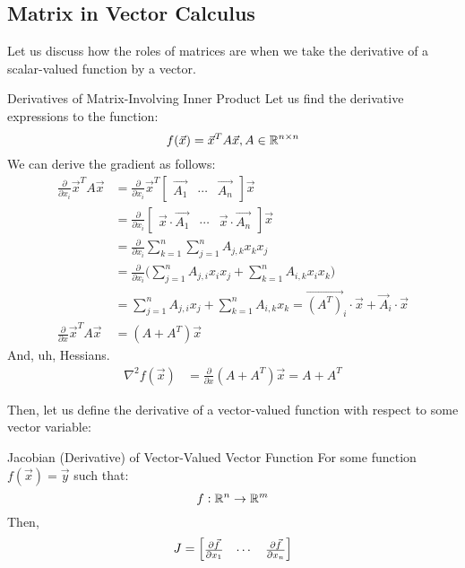 \subsection{Matrix in Vector Calculus}
Let us discuss how the roles of matrices are when we take the derivative of a scalar-valued function by a vector.
\begin{ln-explain}{Derivatives of Matrix-Involving Inner Product}{}
    Let us find the derivative expressions to the function:
    \[
        f(\vec{x}) = \vec{x}^T A \vec{x}, A \in \mathbb{R}^{n \times n}
    \]
    We can derive the gradient as follows:
    \begin{align*}
        \frac{\partial}{\partial x_i} \vec{x}^T A \vec{x}
        &= \frac{\partial}{\partial x_i} \vec{x}^T \begin{bmatrix} \vec{A_1} & \cdots & \vec{A_n} \end{bmatrix} \vec{x} \\
        &= \frac{\partial}{\partial x_i} \begin{bmatrix} \vec{x} \cdot \vec{A_1} & \cdots & \vec{x} \cdot \vec{A_n} \end{bmatrix} \vec{x} \\
        &= \frac{\partial}{\partial x_i} \sum_{k = 1}^n \sum_{j = 1}^n A_{j, k} x_k x_j \\
        &= \frac{\partial}{\partial x_i} \bigg( \sum_{j = 1}^n A_{j, i} x_i x_j + \sum_{k = 1}^n A_{i, k} x_i x_k \bigg) \\
        &= \sum_{j = 1}^n A_{j, i} x_j + \sum_{k = 1}^n A_{i, k} x_k
        = \vec{(A^T)}_i \cdot \vec{x} + \vec{A}_i \cdot\vec{x} \\
        \frac{\partial}{\partial x} \vec{x}^T A \vec{x} &= (A + A^T) \vec{x}
    \end{align*}
    And, uh, Hessians.
    \begin{align*}
        \nabla^2 f(\vec{x})
        &= \frac{\partial}{\partial x} (A + A^T) \vec{x} = A + A^T
    \end{align*}
\end{ln-explain}

Then, let us define the derivative of a vector-valued function with respect to some vector variable:
\begin{ln-define}{Jacobian (Derivative) of Vector-Valued Vector Function}{}
    For some function $f(\vec{x}) = \vec{y}$ such that:
    \[
        f: \mathbb{R}^n \rightarrow \mathbb{R}^m
    \]
    Then,
    \[
        J = \begin{bmatrix} \pdv{\vec{f}}{x_1} & \cdots & \pdv{\vec{f}}{x_n} \end{bmatrix}
    \]
\end{ln-define}

